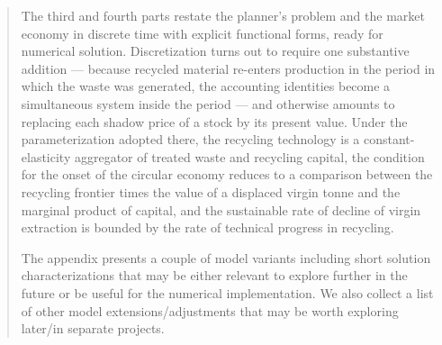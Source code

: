 \begin{abstract}
The third and fourth parts restate the planner's problem and the market economy in discrete time with explicit functional forms, ready for numerical solution. Discretization turns out to require one substantive addition --- because recycled material re-enters production in the period in which the waste was generated, the accounting identities become a simultaneous system inside the period --- and otherwise amounts to replacing each shadow price of a stock by its present value. Under the parameterization adopted there, the recycling technology is a constant-elasticity aggregator of treated waste and recycling capital, the condition for the onset of the circular economy reduces to a comparison between the recycling frontier times the value of a displaced virgin tonne and the marginal product of capital, and the sustainable rate of decline of virgin extraction is bounded by the rate of technical progress in recycling.

The appendix presents a couple of model variants including short solution characterizations that may be either relevant to explore further in the future or be useful for the numerical implementation. We also collect a list of other model extensions/adjustments that may be worth exploring later/in separate projects. 
\end{abstract}